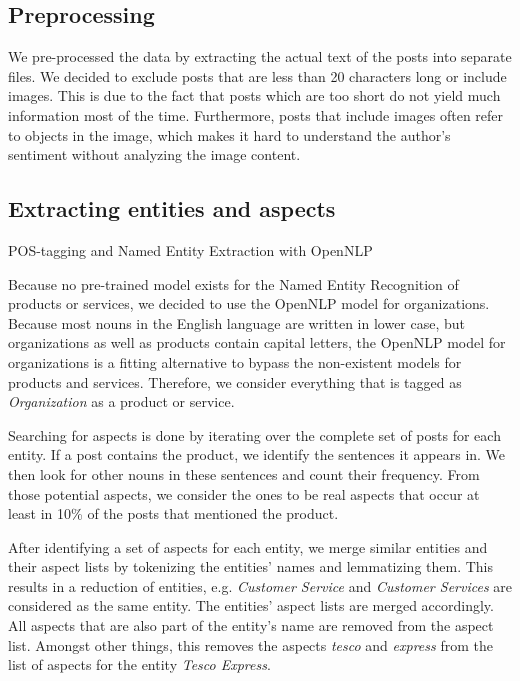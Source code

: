 \documentclass[10pt,a4paper]{article}
\begin{document}
		\subsection{Preprocessing}
		We pre-processed the data by extracting the actual text of the posts into separate files. We decided to exclude posts that are less than 20 characters long or include images. This is due to the fact that posts which are too short do not yield much information most of the time. Furthermore, posts that include images often refer to objects in the image, which makes it hard to understand the author's sentiment without analyzing the image content.
	
		\subsection{Extracting entities and aspects}
		\label{sec:entityextraction}
		POS-tagging and Named Entity Extraction with OpenNLP
		
		Because no pre-trained model exists for the Named Entity Recognition of products or services, we decided to use the OpenNLP model for organizations. Because most nouns in the English language are written in lower case, but organizations as well as products contain capital letters, the OpenNLP model for organizations is a fitting alternative to bypass the non-existent models for products and services. Therefore, we consider everything that is tagged as \textit{Organization} as a product or service.

		Searching for aspects is done by iterating over the complete set of posts for each entity. If a post contains the product, we identify the sentences it appears in. We then look for other nouns in these sentences and count their frequency. From those potential aspects, we consider the ones to be real aspects that occur at least in 10\% of the posts that mentioned the product.

		After identifying a set of aspects for each entity, we merge similar entities and their aspect lists by tokenizing the entities' names and lemmatizing them. This results in a reduction of entities, e.g. \textit{Customer Service} and \textit{Customer Services} are considered as the same entity. The entities' aspect lists are merged accordingly. All aspects that are also part of the entity's name are removed from the aspect list. Amongst other things, this removes the aspects \textit{tesco} and \textit{express} from the list of aspects for the entity \textit{Tesco Express}.
\end{document}
